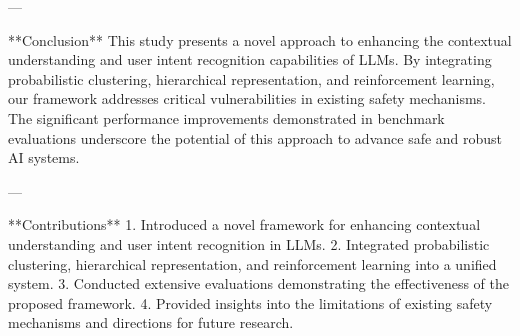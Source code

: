 ---

**Conclusion**  
This study presents a novel approach to enhancing the contextual understanding and user intent recognition capabilities of LLMs. By integrating probabilistic clustering, hierarchical representation, and reinforcement learning, our framework addresses critical vulnerabilities in existing safety mechanisms. The significant performance improvements demonstrated in benchmark evaluations underscore the potential of this approach to advance safe and robust AI systems.

---

**Contributions**  
1. Introduced a novel framework for enhancing contextual understanding and user intent recognition in LLMs.  
2. Integrated probabilistic clustering, hierarchical representation, and reinforcement learning into a unified system.  
3. Conducted extensive evaluations demonstrating the effectiveness of the proposed framework.  
4. Provided insights into the limitations of existing safety mechanisms and directions for future research.  